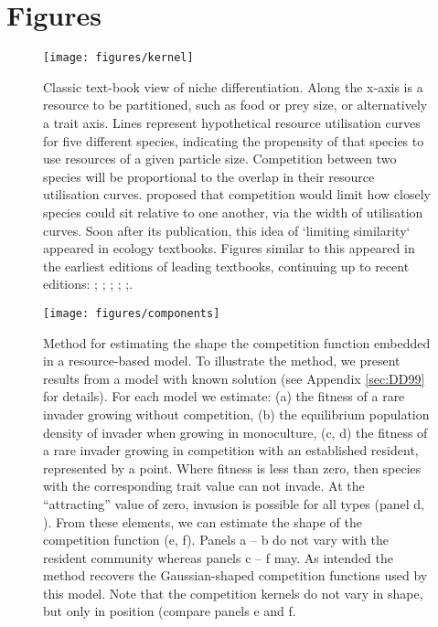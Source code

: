 \documentclass[a4paper,11pt]{article}
\begin{document}
\clearpage

\section{Figures}

\begin{figure}[h]
  \centering
  \texttt{[image: figures/kernel]}
  \caption{Classic text-book view of niche differentiation.  Along the
    x-axis is a resource to be partitioned, such as food or prey size,
    or alternatively a trait axis.  Lines represent hypothetical
    resource utilisation curves for five different species, indicating
    the propensity of that species to use resources of a given particle size.
    Competition between two species will be proportional to
    the overlap in their resource utilisation
    curves. \citet{MacArthur-1967} proposed that competition would
    limit how closely species could sit relative to one another, via
    the width of utilisation curves. Soon after its publication,
    this idea of `limiting similarity` appeared in ecology textbooks.
    Figures similar to this appeared in the earliest
    editions of leading textbooks, continuing up to recent editions:
    \citet[Fig. 7.9]{Begon-1986}; \citet[Fig. 8.29]{Begon-2006};
    \citet[Fig. 12.20]{Krebs-1978}; \citet[????]{ Krebs-2013};
    \citet[Fig. 36.13]{Ricklefs-1973};\citet[Fig. 29.19]{Ricklefs-1999}.}
  \label{fig:competition-kernels}
\end{figure}

\begin{figure}[h]
 \centering
 \texttt{[image: figures/components]}
 \caption{Method for estimating the shape the competition function
   embedded in a resource-based model. To illustrate the
   method, we present results from a model with known solution
   \citep{Dieckmann-1999} (see Appendix \ref{sec:DD99} for
   details). For each model we estimate: (a) the fitness of a rare
   invader growing without competition, (b) the equilibrium population
   density of invader when growing in monoculture, (c, d) the fitness
   of a rare invader growing in competition with an established
   resident, represented by a point.  Where fitness is less than zero,
   then species with the corresponding trait value can not invade.  At
   the ``attracting'' value of zero, invasion is possible for all
   types (panel d, \citealt{Dieckmann-1999}).  From these elements, we
   can estimate the shape of the competition function (e, f).  Panels
   a -- b do not vary with the resident community whereas panels c --
   f may.
   As intended the method recovers the Gaussian-shaped competition
   functions used by this model.  Note that the competition kernels do
   not vary in shape, but only in position (compare panels e and f.}
  \label{fig:components}
\end{figure}
\end{document}
